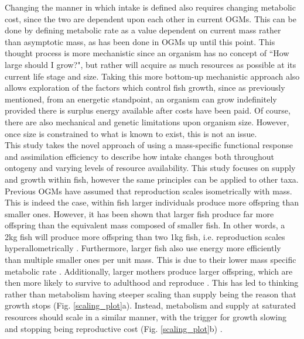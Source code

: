 \documentclass[a4paper, 11pt, hidelinks]{article} %
\begin{document}
	Changing the manner in which intake is defined also requires changing metabolic cost, since the two are dependent upon each other in current OGMs.  This can be done by defining metabolic rate as a value dependent on current mass rather than asymptotic mass, as has been done in OGMs up until this point.  This thought process is more mechanistic since an organism has no concept of ``How large should I grow?", but rather will acquire as much resources as possible at its current life stage and size.  Taking this more bottom-up mechanistic approach also allows exploration of the factors which control fish growth, since as previously mentioned, from an energetic standpoint, an organism can grow indefinitely provided there is surplus energy available after costs have been paid.  Of course, there are also mechanical and genetic limitations upon organism size. However, once size is constrained to what is known to exist, this is not an issue.  %
	\\
	This study takes the novel approach of using a mass-specific functional response and assimilation efficiency to describe how intake changes both throughout ontogeny and varying levels of resource availability. This study focuses on supply and growth within fish, however the same principles can be applied to other taxa.
	\\
	Previous OGMs have assumed that reproduction scales isometrically with mass.  This is indeed the case, within fish larger individuals produce more offspring than smaller ones.  %
	However, it has been shown that larger fish produce far more offspring than the equivalent mass composed of smaller fish.  In other words, a 2kg fish will produce more offspring than two 1kg fish, i.e. reproduction scales hyperallometrically \parencite{Barneche2018}.
	Furthermore, larger fish also use energy more efficiently than multiple smaller ones per unit mass.  This is due to their lower mass specific metabolic rate \parencite{Peters1983, Kleiber1932, Brown2004}.  
	Additionally, larger mothers produce larger offspring, which are then more likely to survive to adulthood and reproduce \parencite{Hixon2014, Marshall2006}. 
	This has led to thinking rather than metabolism having steeper scaling than supply being the reason that growth stops (Fig. \ref{scaling_plot}a).  Instead, metabolism and supply at saturated resources should scale in a similar manner, with the trigger for growth slowing and stopping being reproductive cost (Fig. \ref{scaling_plot}b) \parencite{Marshall2019, Sibly2020}. %
\end{document}
